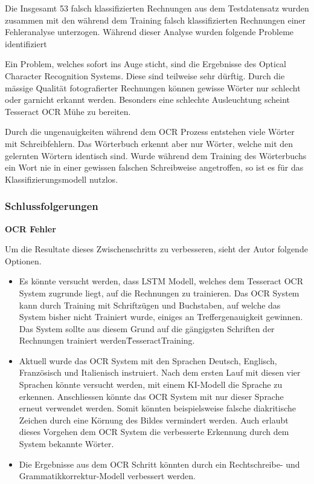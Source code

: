 Die Insgesamt 53 falsch klassifizierten Rechnungen aus dem Testdatensatz wurden zusammen mit den während dem Training falsch klassifizierten Rechnungen einer Fehleranalyse unterzogen. Während dieser Analyse wurden folgende Probleme identifiziert 

Ein Problem, welches sofort ins Auge sticht, sind die Ergebnisse des Optical Character Recognition Systems. Diese sind teilweise sehr dürftig. Durch die mässige Qualität fotografierter Rechnungen können gewisse Wörter nur schlecht oder garnicht erkannt werden. Besonders eine schlechte Ausleuchtung scheint Tesseract OCR Mühe zu bereiten.

Durch die ungenauigkeiten während dem OCR Prozess entstehen viele Wörter mit Schreibfehlern. Das Wörterbuch erkennt aber nur Wörter, welche mit den gelernten Wörtern identisch sind. Wurde während dem Training des Wörterbuchs ein Wort nie in einer gewissen falschen Schreibweise angetroffen, so ist es für das Klassifizierungsmodell nutzlos.

\subsubsection{Schlussfolgerungen}


\textbf{OCR Fehler}

Um die Resultate dieses Zwischenschritts zu verbesseren, sieht der Autor folgende Optionen.

\begin{itemize}
    \item Es könnte versucht werden, dass LSTM Modell, welches dem Tesseract OCR System zugrunde liegt, auf die Rechnungen zu trainieren. Das OCR System kann durch Training mit Schriftzügen und Buchstaben, auf welche das System bisher nicht Trainiert wurde, einiges an Treffergenauigkeit gewinnen. Das System sollte aus diesem Grund auf die gängigsten Schriften der Rechnungen trainiert werden\~{TesseractTraining}.
    \item Aktuell wurde das OCR System mit den Sprachen Deutsch, Englisch, Französisch und Italienisch instruiert. Nach dem ersten Lauf mit diesen vier Sprachen könnte versucht werden, mit einem KI-Modell die Sprache zu erkennen. Anschliessen könnte das OCR System mit nur dieser Sprache erneut verwendet werden. Somit könnten beispielsweise falsche diakritische Zeichen durch eine Körnung des Bildes vermindert werden. Auch erlaubt dieses Vorgehen dem OCR System die verbesserte Erkennung durch dem System bekannte Wörter.
    \item Die Ergebnisse aus dem OCR Schritt könnten durch ein Rechtschreibe- und Grammatikkorrektur-Modell verbessert werden. 
\end{itemize}

